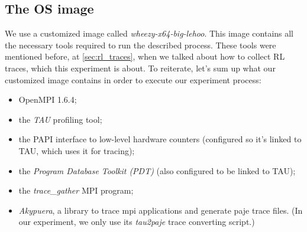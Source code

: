 \subsection{The OS image}
\label{sec:image}
We use a customized image called
\emph{wheezy-x64-big-lehoo}. This image contains all the necessary
tools required to run the described process. These tools were
mentioned before, at \ref{sec:rl_traces}, when we talked about how to
collect RL traces, which this experiment is about. To reiterate, let's
sum up what our customized image contains in order to execute our
experiment process:
\begin{itemize}
\item OpenMPI 1.6.4;
\item the \emph{TAU}\cite{sm06} profiling tool;
\item the PAPI\cite{mbdh99}\cite{lmmsl01} interface to low-level
hardware counters (configured so it's linked to TAU, which uses it for
tracing);
\item the \emph{Program Database Toolkit (PDT)}\cite{lcmsmrr00} (also
configured to be linked to TAU);
\item the \emph{trace\_gather}\cite{ms11} MPI program;
\item \emph{Akypuera}\cite{s13}, a library to trace mpi applications
and generate paje trace files. (In our experiment, we only use
its \emph{tau2paje} trace converting script.)
\end{itemize}
